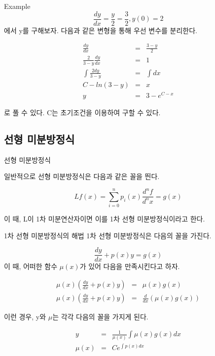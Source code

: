 \documentclass{beamer}
\begin{document}
\begin{frame}{Example}  
\begin{equation}
\frac{dy}{dx} = \frac{y}{2} = \frac{3}{2}, y(0)=2
\end{equation} 
에서 y를 구해보자. 다음과 같은 변형을 통해 우선 변수를 분리한다. 

\begin{eqnarray} 
\frac{dy}{dx} &=& \frac{3-y}{2} \\ 
\frac{2}{3-y} \frac{dy}{dx} &=& 1 \\ 
\int \frac{2 dy} {3-y} &=& \int dx \\
C - ln(3-y) &=&x \\ 
y &=& 3-e^{C-x} 
\end{eqnarray} 

로 풀 수 있다. C는 초기조건을 이용하여 구할 수 있다. 
\end{frame}


\subsection{선형 미분방정식} 

\begin{frame}{선형 미분방정식} 

일반적으로 선형 미분방정식은 다음과 같은 꼴을 띈다. 

\begin{equation} 
L f(x) = \sum_{i=0}^n p_i(x) \frac{d^nf}{d^nx} = g(x)
\end{equation} 

이 때, L이 1차 미분연산자이면 이를 1차 선형 미분방정식이라고 한다. 

\end{frame}

\begin{frame}{1차 선형 미분방정식의 해법} 
1차 선형 미분방정식은 다음의 꼴을 가진다. 

\begin{equation}
\frac{dy}{dx} + p(x)y = g(x)
\end{equation} 
이 때, 어떠한 함수 $\mu(x)$가 있어 다음을 만족시킨다고 하자. 

\begin{eqnarray}
\mu(x) (\frac{dy}{dx} + p(x)y) &=& \mu(x)g(x) \\ 
\mu(x) (\frac{dy}{dx} + p(x)y) &=& \frac{d}{dx}(\mu(x)g(x))
\end{eqnarray}

이런 경우, y와 $\mu$는 각각 다음의 꼴을 가지게 된다. 

\begin{eqnarray} 
y  &=& \frac{1}{\mu(x)} \int \mu(x)g(x) dx\\
\mu(x) &=& C e^{\int p(x)dx}
\end{eqnarray} 


\end{frame}
\end{document}
